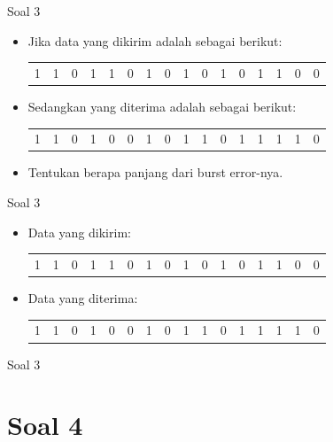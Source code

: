 \documentclass[aspectratio=169]{beamer}
\begin{document}
\begin{frame}[t]{Soal 3}
	\begin{itemize}
		\item Jika data yang dikirim adalah sebagai berikut:\\
		
		\begin{tabular}{cccccccccccccccc}
			1 & 1 & 0 & 1 & 1 & 0 & 1 & 0 & 1 & 0 & 1 & 0 & 1 & 1 & 0 & 0 \\
		\end{tabular}
	
		\item Sedangkan yang diterima adalah sebagai berikut: \\
		
		\begin{tabular}{cccccccccccccccc}
			1 & 1 & 0 & 1 & 0 & 0 & 1 & 0 & 1 & 1 & 0 & 1 & 1 & 1 & 1 & 0 \\
		\end{tabular}
		\item Tentukan berapa panjang dari burst error-nya.
	\end{itemize}
\end{frame}

\begin{frame}[t]{Soal 3}
	\begin{itemize}
		\item Data yang dikirim:\\
		
		\begin{tabular}{cccccccccccccccc}
			1 & 1 & 0 & 1 & 1 & 0 & 1 & 0 & 1 & 0 & 1 & 0 & 1 & 1 & 0 & 0 \\
		\end{tabular}
		
		\item Data yang diterima: \\
		
		\begin{tabular}{cccccccccccccccc}
			1 & 1 & 0 & 1 & 0 & 0 & 1 & 0 & 1 & 1 & 0 & 1 & 1 & 1 & 1 & 0 \\
		\end{tabular}
	
	\end{itemize}
\end{frame}

\begin{frame}[t]{Soal 3}
	
\end{frame}

\section{Soal 4}
\end{document}
